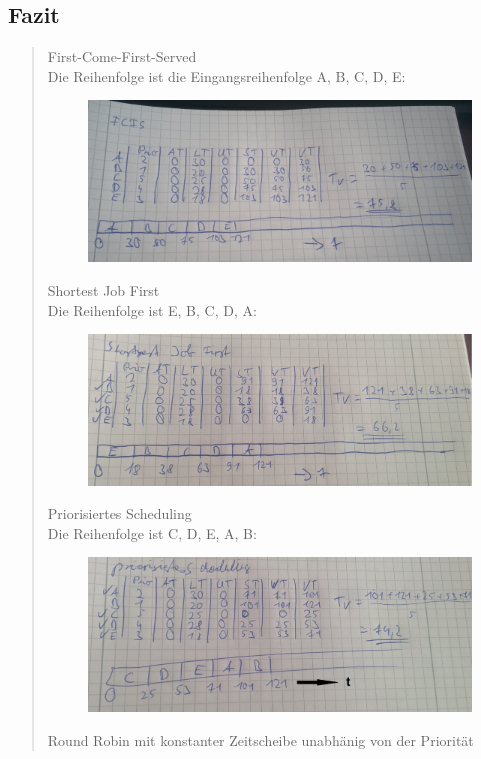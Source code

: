 	\subsection{Fazit}
		\begin{quote}
			First-Come-First-Served\\
			Die Reihenfolge ist die Eingangsreihenfolge A, B, C, D, E:\\
			\begin{figure}[h]
				\includegraphics[width=0.7\linewidth]{content/FCFS}
				\caption{}
				\label{fig:FCFS}
			\end{figure}
			\newpage
			Shortest Job First\\ 
			Die Reihenfolge ist E, B, C, D, A:\\
			\begin{figure}[h]
				\includegraphics[width=0.7\linewidth]{content/SJF}
				\caption{}
				\label{fig:SJF}
			\end{figure}
			\newpage
			Priorisiertes Scheduling\\
			Die Reihenfolge ist C, D, E, A, B:\\
			\begin{figure}[h]
				\includegraphics[width=0.7\linewidth]{content/PS}
				\caption{}
				\label{fig:PS}
			\end{figure}
			\newpage
			Round Robin mit konstanter Zeitscheibe unabh\"anig von der Priorit\"at\\

\end{quote}
